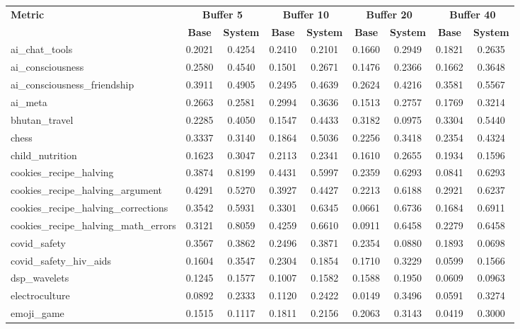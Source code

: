 \documentclass[pdflatex,sn-mathphys-num]{sn-jnl}%
\theoremstyle{thmstyleone}%
\theoremstyle{thmstyletwo}%
\theoremstyle{thmstylethree}%
\begin{document}
\begin{appendices}
\begin{landscape}
\begin{longtable}{@{}p{3.8cm}cccccccc@{}}
\toprule
\textbf{Metric} & \multicolumn{2}{c}{\textbf{Buffer 5}} & \multicolumn{2}{c}{\textbf{Buffer 10}} & \multicolumn{2}{c}{\textbf{Buffer 20}} & \multicolumn{2}{c}{\textbf{Buffer 40}} \\
\cmidrule(lr){2-3}\cmidrule(lr){4-5}\cmidrule(lr){6-7}\cmidrule(lr){8-9}
 & \textbf{Base} & \textbf{System} & \textbf{Base} & \textbf{System} & \textbf{Base} & \textbf{System} & \textbf{Base} & \textbf{System} \\
\midrule
\endhead
ai\_chat\_tools & 0.2021 & 0.4254 & 0.2410 & 0.2101 & 0.1660 & 0.2949 & 0.1821 & 0.2635 \\
ai\_consciousness & 0.2580 & 0.4540 & 0.1501 & 0.2671 & 0.1476 & 0.2366 & 0.1662 & 0.3648 \\
ai\_consciousness\_friendship & 0.3911 & 0.4905 & 0.2495 & 0.4639 & 0.2624 & 0.4216 & 0.3581 & 0.5567 \\
ai\_meta & 0.2663 & 0.2581 & 0.2994 & 0.3636 & 0.1513 & 0.2757 & 0.1769 & 0.3214 \\
bhutan\_travel & 0.2285 & 0.4050 & 0.1547 & 0.4433 & 0.3182 & 0.0975 & 0.3304 & 0.5440 \\
chess & 0.3337 & 0.3140 & 0.1864 & 0.5036 & 0.2256 & 0.3418 & 0.2354 & 0.4324 \\
child\_nutrition & 0.1623 & 0.3047 & 0.2113 & 0.2341 & 0.1610 & 0.2655 & 0.1934 & 0.1596 \\
cookies\_recipe\_halving & 0.3874 & 0.8199 & 0.4431 & 0.5997 & 0.2359 & 0.6293 & 0.0841 & 0.6293 \\
cookies\_recipe\_halving\_argument & 0.4291 & 0.5270 & 0.3927 & 0.4427 & 0.2213 & 0.6188 & 0.2921 & 0.6237 \\
cookies\_recipe\_halving\_corrections & 0.3542 & 0.5931 & 0.3301 & 0.6345 & 0.0661 & 0.6736 & 0.1684 & 0.6911 \\
cookies\_recipe\_halving\_math\_errors & 0.3121 & 0.8059 & 0.4259 & 0.6610 & 0.0911 & 0.6458 & 0.2279 & 0.6458 \\
covid\_safety & 0.3567 & 0.3862 & 0.2496 & 0.3871 & 0.2354 & 0.0880 & 0.1893 & 0.0698 \\
covid\_safety\_hiv\_aids & 0.1604 & 0.3547 & 0.2304 & 0.1854 & 0.1710 & 0.3229 & 0.0599 & 0.1566 \\
dsp\_wavelets & 0.1245 & 0.1577 & 0.1007 & 0.1582 & 0.1588 & 0.1950 & 0.0609 & 0.0963 \\
electroculture & 0.0892 & 0.2333 & 0.1120 & 0.2422 & 0.0149 & 0.3496 & 0.0591 & 0.3274 \\
emoji\_game & 0.1515 & 0.1117 & 0.1811 & 0.2156 & 0.2063 & 0.3143 & 0.0419 & 0.3000 \\

\end{longtable}
\end{landscape}
\end{appendices}
\end{document}
